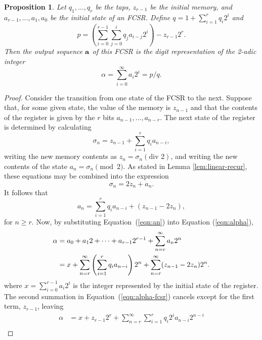 \documentclass[english]{article}
\theoremstyle{plain}
\newtheorem{proposition}[theorem]{Proposition}%
\theoremstyle{definition}
\theoremstyle{remark}
\begin{document}
\begin{proposition}{\rm \cite{art:kg97}}\label{prop:FCSR-seq}
  Let $q_1,\dots,q_r$ be the taps, $z_{r-1}$ be the initial memory, and
  $a_{r-1},\dots,a_1,a_0$ be the initial state of an FCSR. Define
  $q=1+\sum_{i=1}^{r}q_i2^i$ and
  \begin{equation*}
    p=\left(\sum_{i=0}^{r-1}\sum_{j=0}^iq_ja_{i-j}2^i\right)-z_{r-1}2^r.
  \end{equation*}
  Then the output sequence ${\bf a}$ of this FCSR is the digit representation of
  the 2-adic integer
  \begin{equation}\label{eqn:alpha}
    \alpha=\sum_{i=0}^\infty a_i2^i=p/q.
  \end{equation}
\end{proposition}
\begin{proof}
  Consider the transition from one state of the FCSR to the next. Suppose that,
  for some given state, the value of the memory is $z_{n-1}$ and that the
  contents of the register is given by the $r$ bits $a_{n-1},\dots,a_{n-r}$.
  The next state of the register is determined by calculating
  \begin{equation*}
    \sigma_n=z_{n-1}+\sum_{i=1}^rq_ia_{n-i},
  \end{equation*}
  writing the new memory contents as $z_n=\sigma_n(\text{div }2)$, and writing
  the new contents of the state $a_n=\sigma_n\pmod2$. As stated in Lemma
  \ref{lem:linear-recur}, these equations may be combined into the expression
  \[
    \sigma_n=2z_n+a_n.
  \]
  It follows that
  \begin{equation}\label{eqn:an}
    a_n=\sum_{i=1}^rq_ia_{n-i}+(z_{n-1}-2z_n),
  \end{equation}
  for $n\geq r$. Now, by substituting Equation~(\ref{eqn:an}) into Equation
  (\ref{eqn:alpha}),
  \begin{align}
    \alpha&=a_0+a_1 2+\cdots+a_{r-1}2^{r-1}+\sum_{n=r}^\infty a_n2^n \notag\\
          &=x+\sum_{n=r}^\infty\left( \sum_{i=1}^r q_ia_{n-i} \right)2^n
          +\sum_{n=r}^\infty (z_{n-1}-2z_n)2^n. \label{eqn:alpha-fcsr}
  \end{align}
  where $x=\sum_{i=0}^{r-1}a_i2^i$ is the integer represented by the initial
  state of the register. The second summation in Equation~(\ref{eqn:alpha-fcsr})
  cancels except for the first term, $z_{r-1}$, leaving
  \begin{align*}
    \alpha&=x+z_{r-1}2^r+\sum_{n=r}^\infty\sum_{i=1}^r q_i2^ia_{n-i}2^{n-i}\\

\end{align*}
\end{proof}
\end{document}
